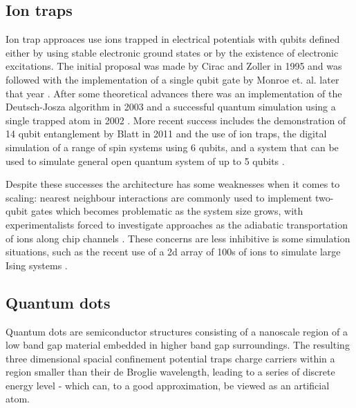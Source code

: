 \subsection{Ion traps}

Ion trap approaces use ions trapped in electrical potentials with qubits defined either by using stable electronic ground states or by the existence of electronic excitations. The initial proposal was made by Cirac and Zoller in 1995 \cite{cirac_zoller_ion_trap_proposal_95} and was followed with the implementation of a single qubit gate by Monroe et. al. later that year \cite{monroe_ion_trap_gate_95}. After some theoretical advances  \cite{first_ion_trap_wineland_98} there was an implementation of the Deutsch-Josza algorithm \cite{ion_trap_deutsch_jozsa_03} in 2003 and a successful quantum simulation using a single trapped atom in 2002 \cite{ion_trap_simulator_02}. More recent success includes the demonstration of 14 qubit entanglement by Blatt in 2011 \cite{ion_trap_14_qubits} and the use of ion traps, the digital simulation of a range of spin systems \cite{ion_trap_digital_simulator} using 6 qubits, and a system that can be used to simulate general open quantum system of up to 5 qubits \cite{ion_trap_simulator}.

Despite these successes the architecture has some weaknesses when it comes to scaling: nearest neighbour interactions are commonly used to implement two-qubit gates which becomes problematic as the system size grows, with experimentalists forced to investigate approaches as the adiabatic transportation of ions along chip channels \cite{ion_trap_on_chip}. These concerns are less inhibitive is some simulation situations, such as the recent use of a 2d array of 100s of ions to simulate large Ising systems \cite{ion_trap_magnetism_simulator}.

\subsection{Quantum dots}

Quantum dots are semiconductor structures consisting of a nanoscale region of a low band gap material embedded in higher band gap surroundings. The resulting three dimensional spacial confinement potential traps charge carriers within a region smaller than their de Broglie wavelength, leading to a series of discrete energy level - which can, to a good approximation, be viewed as an artificial atom.

